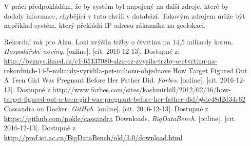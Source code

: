 \documentclass[czech]{article}
\begin{document}
V práci předpokládám, že by systém byl napojený na další zdroje, které by dodaly informace, chybějící v tuto chvíli v databázi. Takovým zdrojem může být například systém, který překládá IP adresu zákazníka na geolokaci.

\begin{thebibliography}{}
    Rekordní rok pro Alzu. Loni zvýšila tržby o čtvrtinu na 14,5 miliardy korun. \emph{Hospodářské noviny}. [online]. [cit. 2016-12-13]. Dostupné z: \url{http://byznys.ihned.cz/c1-65137080-alza-cz-zvysila-trzby-o-ctvrtinu-na-rekordnich-14-5-miliardy-vyridila-pet-milionu-objednave}
    How Target Figured Out A Teen Girl Was Pregnant Before Her Father Did. \emph{Forbes}. [online]. [cit. 2016-12-13]. Dostupné z \url{http://www.forbes.com/sites/kashmirhill/2012/02/16/how-target-figured-out-a-teen-girl-was-pregnant-before-her-father-did/#de48d2d34c62}
    Cassandra on Docker. \emph{GitHub}. [online]. [cit. 2016-12-13]. Dostupné z \url{https://github.com/pokle/cassandra}
    Downloads. \emph{BigDataBench}. [online]. [cit. 2016-12-13]. Dostupné z \url{http://prof.ict.ac.cn/BigDataBench/old/3.0/download.html}

\end{thebibliography}
\end{document}
